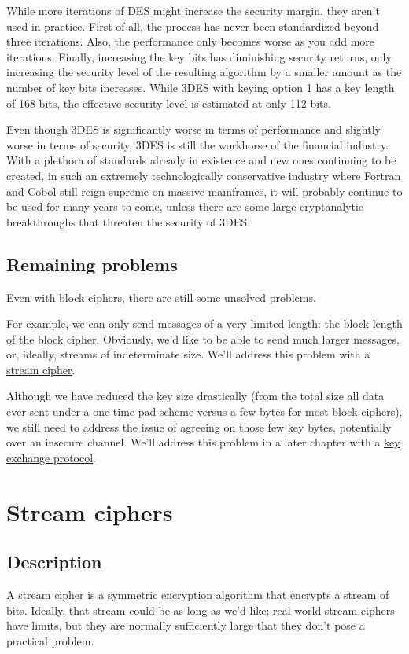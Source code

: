 \documentclass[11pt,ebook,table,dvipsnames]{memoir}
\begin{document}
While more iterations of DES might increase the security margin, they
aren't used in practice. First of all, the process has never been
standardized beyond three iterations. Also, the performance only
becomes worse as you add more iterations. Finally, increasing the key
bits has diminishing security returns, only increasing the security
level of the resulting algorithm by a smaller amount as the number of
key bits increases. While 3DES with keying option 1 has a key length
of 168 bits, the effective security level is estimated at only 112
bits.

Even though 3DES is significantly worse in terms of performance and
slightly worse in terms of security, 3DES is still the workhorse of
the financial industry. With a plethora of standards already in
existence and new ones continuing to be created, in such an extremely
technologically conservative industry where Fortran and Cobol still
reign supreme on massive mainframes, it will probably continue to be
used for many years to come, unless there are some large cryptanalytic
breakthroughs that threaten the security of 3DES.
\section{Remaining problems}
\label{sec-2-2-4}
Even with block ciphers, there are still some unsolved problems.

For example, we can only send messages of a very limited length: the
block length of the block cipher. Obviously, we'd like to be able to
send much larger messages, or, ideally, streams of indeterminate size.
We'll address this problem with a \hyperref[sec-2-3]{stream cipher}.

Although we have reduced the key size drastically (from the total size
all data ever sent under a one-time pad scheme versus a few bytes for
most block ciphers), we still need to address the issue of agreeing on
those few key bytes, potentially over an insecure channel. We'll
address this problem in a later chapter with a \hyperref[sec-2-4]{key exchange protocol}.
\chapter{Stream ciphers}
\label{sec-2-3}
\section{Description}
\label{sec-2-3-1}
A stream cipher is a symmetric encryption algorithm that encrypts a
stream of bits. Ideally, that stream could be as long as we'd like;
real-world stream ciphers have limits, but they are normally
sufficiently large that they don't pose a practical problem.
\end{document}
